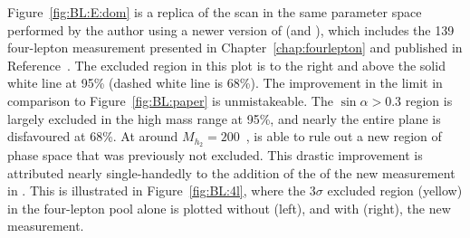 Figure~\ref{fig:BL:E:dom} is a replica of the scan in the same parameter space performed by the author using a newer version of \contur (and \rivet), which includes the \unit{139}{\invfb} four-lepton measurement presented in Chapter~\ref{chap:fourlepton} and published in Reference~\cite{m4l2021_paper}. The excluded region in this plot is to the right and above the solid white line at 95\% (dashed white line is 68\%). The improvement in the limit in comparison to Figure~\ref{fig:BL:paper} is unmistakeable. The $\sin\alpha > 0.3$ region is largely excluded in the high mass range at 95\%, and nearly the entire plane is disfavoured at 68\%. At around $M_{h_2}=200$~\GeV, \contur is able to rule out a new region of phase space that was previously not excluded. This drastic improvement is attributed nearly single-handedly to the addition of the of the new \mFourL{} measurement in \rivet. This is illustrated in Figure~\ref{fig:BL:4l}, where the $3\sigma$ excluded region (yellow) in the four-lepton pool alone is plotted without (left), and with (right), the new measurement.

